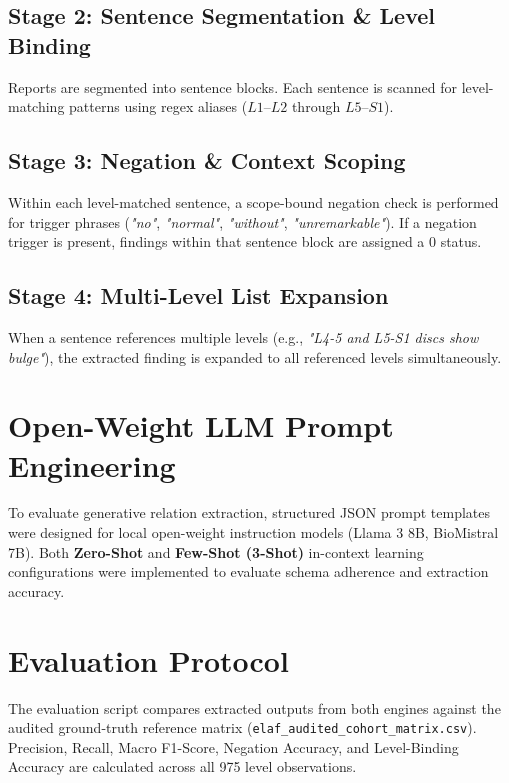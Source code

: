 \subsection{Stage 2: Sentence Segmentation \& Level Binding}
Reports are segmented into sentence blocks. Each sentence is scanned for level-matching patterns using regex aliases ($L1$--$L2$ through $L5$--$S1$).

\subsection{Stage 3: Negation \& Context Scoping}
Within each level-matched sentence, a scope-bound negation check is performed for trigger phrases (\textit{"no"}, \textit{"normal"}, \textit{"without"}, \textit{"unremarkable"}). If a negation trigger is present, findings within that sentence block are assigned a $0$ status.

\subsection{Stage 4: Multi-Level List Expansion}
When a sentence references multiple levels (e.g., \textit{"L4-5 and L5-S1 discs show bulge"}), the extracted finding is expanded to all referenced levels simultaneously.

\section{Open-Weight LLM Prompt Engineering}
To evaluate generative relation extraction, structured JSON prompt templates were designed for local open-weight instruction models (Llama 3 8B, BioMistral 7B). Both \textbf{Zero-Shot} and \textbf{Few-Shot (3-Shot)} in-context learning configurations were implemented to evaluate schema adherence and extraction accuracy.

\section{Evaluation Protocol}
The evaluation script compares extracted outputs from both engines against the audited ground-truth reference matrix (\texttt{elaf\_audited\_cohort\_matrix.csv}). Precision, Recall, Macro F1-Score, Negation Accuracy, and Level-Binding Accuracy are calculated across all 975 level observations.
